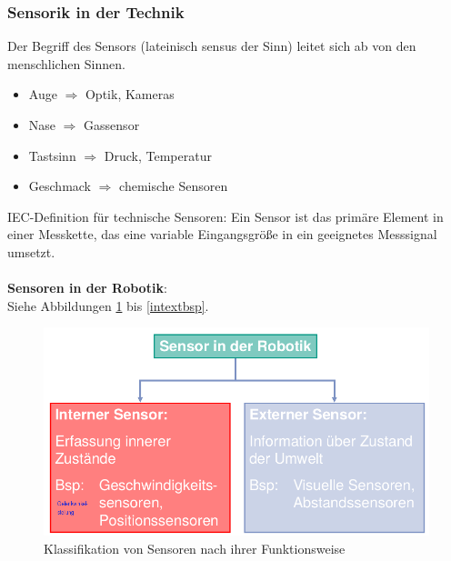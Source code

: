 \subsubsection{Sensorik in der Technik}
Der Begriff des Sensors (lateinisch \glqq sensus\grqq{} der Sinn) leitet sich ab von den menschlichen Sinnen.
\begin{itemize}
\setlength\itemsep{0em}
\item Auge $\Rightarrow$ Optik, Kameras
\item Nase $\Rightarrow$ Gassensor
\item Tastsinn $\Rightarrow$ Druck, Temperatur
\item Geschmack $\Rightarrow$ chemische Sensoren
\end{itemize}
IEC-Definition für technische Sensoren:
\glqq Ein Sensor ist das primäre Element in einer Messkette, das eine variable Eingangsgröße in ein geeignetes Messsignal umsetzt.\grqq \\ \\
\textbf{Sensoren in der Robotik}:\\
Siehe Abbildungen \ref{klassfkt} bis \ref{intextbsp}.
\begin{figure}[h!]
	\centering
	\includegraphics[width=0.5\linewidth]{figures/ch04_sensrob.png}
	\caption{Klassifikation von Sensoren nach ihrer Funktionsweise}
	\label{klassfkt}
\end{figure}
